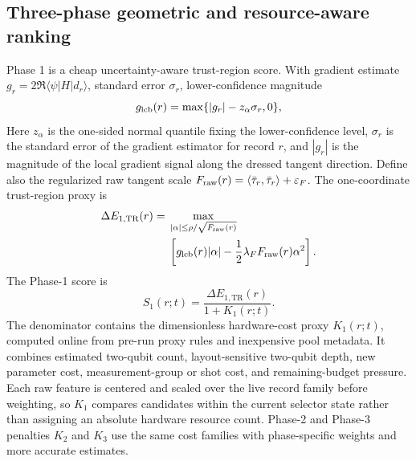 \documentclass[
  reprint,
  amsmath,
  amssymb,
  aps,
  pra,
  nofootinbib,
  superscriptaddress,
  floatfix
]{revtex4-2}
\newcommand{\TR}{\mathrm{TR}}
\newcommand{\eps}{\varepsilon}
\begin{document}
\subsection{Three-phase geometric and resource-aware ranking}

Phase 1 is a cheap uncertainty-aware trust-region score. With gradient estimate $g_r=2\Re\langle\psi|H|d_r\rangle$, standard error $\sigma_r$, lower-confidence magnitude
\begin{equation}
g_{\rm lcb}(r)=\max\{|g_r|-z_{\alpha}\sigma_r,0\},
\label{eq:lcb_gradient}
\end{equation}
Here $z_{\alpha}$ is the one-sided normal quantile fixing the lower-confidence level, $\sigma_r$ is the standard error of the gradient estimator for record $r$, and $|g_r|$ is the magnitude of the local gradient signal along the dressed tangent direction.
Define also the regularized raw tangent scale $F_{\rm raw}(r)=\langle\bar\tau_r,\bar\tau_r\rangle+\eps_F$. The one-coordinate trust-region proxy is
\begin{equation}
\begin{split}
\Delta E_{1,\TR}(r)={}&\max_{|\alpha|\le \rho/\sqrt{F_{\rm raw}(r)}} \\
&\left[g_{\rm lcb}(r)|\alpha|-\frac12\lambda_FF_{\rm raw}(r)\alpha^2\right].
\end{split}
\label{eq:phase1_gain}
\end{equation}
The Phase-1 score is
\begin{equation}
S_1(r;t)=\frac{\Delta E_{1,\TR}(r)}{1+K_1(r;t)}.
\label{eq:phase1_score}
\end{equation}
The denominator contains the dimensionless hardware-cost proxy $K_1(r;t)$, computed online from pre-run proxy rules and inexpensive pool metadata. It combines estimated two-qubit count, layout-sensitive two-qubit depth, new parameter cost, measurement-group or shot cost, and remaining-budget pressure. Each raw feature is centered and scaled over the live record family before weighting, so $K_1$ compares candidates within the current selector state rather than assigning an absolute hardware resource count. Phase-2 and Phase-3 penalties $K_2$ and $K_3$ use the same cost families with phase-specific weights and more accurate estimates.
\end{document}
